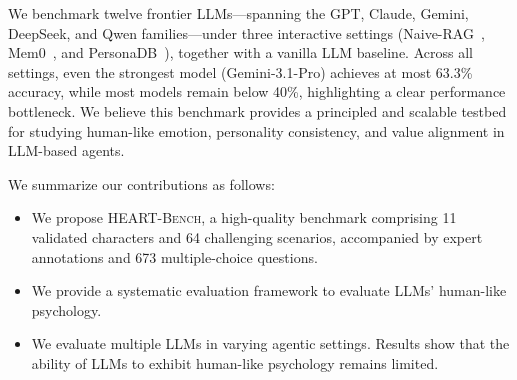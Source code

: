 \documentclass{article}
\newcommand{\ourbench}[0]{\textsc{HEART-Bench}\xspace}
\begin{document}
We benchmark twelve frontier LLMs---spanning the GPT, Claude, Gemini, DeepSeek, and Qwen families—under three interactive settings (Naive-RAG~\cite{lewis2020retrieval}, Mem0~\cite{chhikara2025mem0}, and PersonaDB~\cite{sun2025persona}), together with a vanilla LLM baseline. Across all settings, even the strongest model (Gemini-3.1-Pro) achieves at most
63.3\% accuracy, while most models remain below 40\%, highlighting a clear performance bottleneck. We believe this benchmark provides a principled and scalable testbed for studying human-like emotion, personality consistency, and value alignment in LLM-based agents.

We summarize our contributions as follows:
\begin{itemize}[leftmargin=2em]
    \item We propose \ourbench{}, a high-quality benchmark comprising 11 validated characters and 64 challenging scenarios, accompanied by expert annotations and 673 multiple-choice questions.
    \item We provide a systematic evaluation framework to evaluate LLMs' human-like psychology. 
    \item We evaluate multiple LLMs in varying agentic settings. Results show that the ability of LLMs to exhibit human-like psychology remains limited.
\end{itemize}
\end{document}
